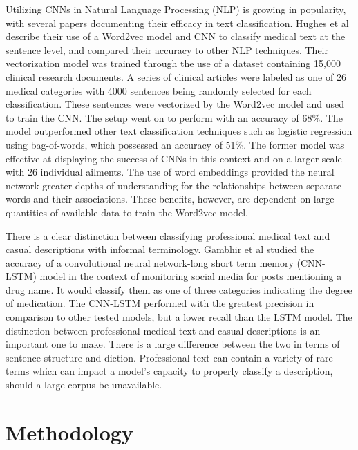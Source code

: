 \documentclass[12pt]{report}
\begin{document}
Utilizing CNNs in Natural Language Processing (NLP) is growing in popularity,
with several papers documenting their efficacy in text classification. Hughes
et al describe their use of a Word2vec model and CNN to classify medical text
at the sentence level, and compared their accuracy to other NLP techniques.
Their vectorization model was trained through the use of a dataset containing
15,000 clinical research documents. A series of clinical articles were
labeled as one of 26 medical categories with 4000 sentences being
randomly selected for each classification. These sentences were vectorized
by the Word2vec model and used to train the CNN. The setup went on to
perform with an accuracy of 68\%. The model outperformed other text classification techniques
such as logistic regression using bag-of-words, which possessed an
accuracy of 51\%. The former model was effective at displaying the success of CNNs
in this context and on a larger scale with 26 individual ailments. The use of
word embeddings provided the neural network greater depths of
understanding for the relationships between separate words and their
associations. These benefits, however, are dependent on large quantities of
available data to train the Word2vec model\cite{HughesLKS17}.

There is a clear distinction between classifying professional medical text
and casual descriptions with informal terminology. Gambhir et al studied the
accuracy of a convolutional neural network-long short term memory (CNN-LSTM)
model in the context of monitoring social media for posts mentioning a drug name.
It would classify them as one of three categories indicating the degree of medication.
The CNN-LSTM performed with the greatest precision in
comparison to other tested models, but a lower recall than the LSTM model.
The distinction between professional medical text and casual descriptions is
an important one to make. There is a large difference between the two in
terms of sentence structure and diction. Professional text can contain a
variety of rare terms which can impact a model's
capacity to properly classify a description, should a large corpus be
unavailable\cite{tokala-etal-2018-deep}.


\chapter{Methodology}
\end{document}

